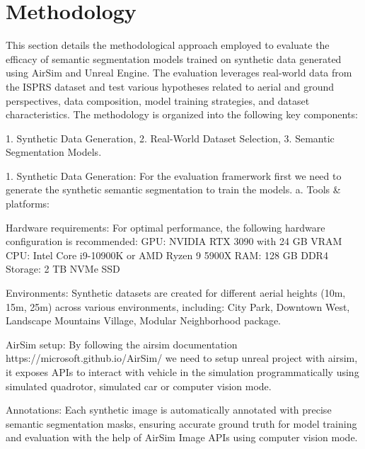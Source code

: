 \documentclass[../report.tex]{subfiles}
\begin{document}
    \section{Methodology}
    \label{sec:methodology}



    This section details the methodological approach employed to evaluate the efficacy of semantic segmentation models trained on synthetic data generated using AirSim and Unreal Engine. 
    The evaluation leverages real-world data from the ISPRS dataset and test various hypotheses related to aerial and ground perspectives, data composition, model training strategies, and dataset characteristics. The methodology is organized into the following key components:
    
    1. Synthetic Data Generation, 2. Real-World Dataset Selection, 3. Semantic Segmentation Models.
    
    1. Synthetic Data Generation: 
    For the evaluation framerwork first we need to generate the synthetic semantic segmentation to train the models. 
    a. Tools \& platforms:
    
    Hardware requirements:
    For optimal performance, the following hardware configuration is recommended: 
    GPU: NVIDIA RTX 3090 with 24 GB VRAM
    CPU: Intel Core i9-10900K or AMD Ryzen 9 5900X
    RAM: 128 GB DDR4
    Storage: 2 TB NVMe SSD
    
    Environments:
    Synthetic datasets are created for different aerial heights (10m, 15m, 25m) across various environments, including: City Park, Downtown West, Landscape Mountains Village, Modular Neighborhood package. 

    AirSim setup: 
    By following the airsim documentation https://microsoft.github.io/AirSim/ we need to setup unreal project with airsim, it exposes APIs to interact with vehicle in the simulation programmatically using simulated quadrotor, simulated car or computer vision mode.
    
    Annotations: 
    Each synthetic image is automatically annotated with precise semantic segmentation masks, ensuring accurate ground truth for model training and evaluation with the help of AirSim Image APIs using computer vision mode.
\end{document}
